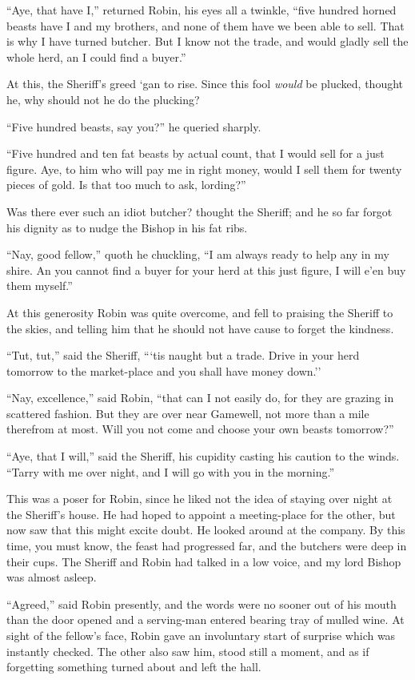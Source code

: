 ``Aye, that have I,'' returned Robin, his eyes all a twinkle, ``five
hundred horned beasts have I and my brothers, and none of them have we
been able to sell. That is why I have turned butcher. But I know not the
trade, and would gladly sell the whole herd, an I could find a buyer.''

At this, the Sheriff's greed `gan to rise. Since this fool \emph{would}
be plucked, thought he, why should not he do the plucking?

``Five hundred beasts, say you?'' he queried sharply.

``Five hundred and ten fat beasts by actual count, that I would sell for
a just figure. Aye, to him who will pay me in right money, would I sell
them for twenty pieces of gold. Is that too much to ask, lording?''

Was there ever such an idiot butcher? thought the Sheriff; and he so far
forgot his dignity as to nudge the Bishop in his fat ribs.

``Nay, good fellow,'' quoth he chuckling, ``I am always ready to help
any in my shire. An you cannot find a buyer for your herd at this just
figure, I will e'en buy them myself.''

At this generosity Robin was quite overcome, and fell to praising the
Sheriff to the skies, and telling him that he should not have cause to
forget the kindness.

``Tut, tut,'' said the Sheriff, ```tis naught but a trade. Drive in your
herd tomorrow to the market-place and you shall have money down.''

``Nay, excellence,'' said Robin, ``that can I not easily do, for they
are grazing in scattered fashion. But they are over near Gamewell, not
more than a mile therefrom at most. Will you not come and choose your
own beasts tomorrow?''

``Aye, that I will,'' said the Sheriff, his cupidity casting his caution
to the winds. ``Tarry with me over night, and I will go with you in the
morning.''

This was a poser for Robin, since he liked not the idea of staying over
night at the Sheriff's house. He had hoped to appoint a meeting-place
for the other, but now saw that this might excite doubt. He looked
around at the company. By this time, you must know, the feast had
progressed far, and the butchers were deep in their cups. The Sheriff
and Robin had talked in a low voice, and my lord Bishop was almost
asleep.

``Agreed,'' said Robin presently, and the words were no sooner out of
his mouth than the door opened and a serving-man entered bearing tray of
mulled wine. At sight of the fellow's face, Robin gave an involuntary
start of surprise which was instantly checked. The other also saw him,
stood still a moment, and as if forgetting something turned about and
left the hall.

